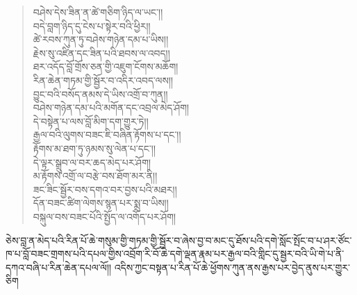 \documentclass{article}
\begin{document}
\begin{verse}
    བཤེས་དེས་ཟིན་ན་ཚེ་གཅིག་ཉིད་ལ་ཡང༌།། \\
    བདེ་བླག་ཉིད་དུ་ངེས་པ་སྟེར་བའི་ཕྱིར།། \\
    ཚེ་རབས་ཀུན་ཏུ་བཤེས་གཉེན་དམ་པ་ཡིས།། \\
    རྗེས་སུ་འཛིན་དང་ཟིན་པའི་ཐབས་ལ་འབད།། \\
    ཐར་འདོད་བློ་གྲོས་ཅན་གྱི་འཇུག་ངོགས་མཆོག། \\
    རིན་ཆེན་གཏམ་གྱི་སྦྱོར་བ་འདིར་འབད་ལས།། \\
    བྱུང་བའི་བསོད་ནམས་དེ་ཡིས་འགྲོ་བ་ཀུན།། \\
    བཤེས་གཉེན་དམ་པའི་མགོན་དང་འབྲལ་མེད་ཤོག། \\
    དེ་བསྟེན་པ་ལས་བློ་མིག་དག་གྱུར་ཏེ།། \\
    རྒྱལ་བའི་ལུགས་བཟང་ཇི་བཞིན་རྟོགས་པ་དང༌།། \\
    རྟོགས་མ་ཐག་ཏུ་ཉམས་སུ་ལེན་པ་དང༌།། \\
    དེ་ལྟར་སྒྲུབ་ལ་བར་ཆད་མེད་པར་ཤོག། \\
    མ་རྟོགས་འགྲོ་ལ་བརྩེ་བས་ཐོག་མར་ནི།། \\
    ཟང་ཟིང་སྦྱོར་བས་དགའ་བར་བྱས་པའི་མཐར།། \\
    དོན་བཟང་ཚིག་ལེགས་སྙན་པར་སྨྲ་བ་ཡིས།། \\
    བསྐུལ་བས་བཟང་པོའི་སྤྱོད་ལ་འགོད་པར་ཤོག།
\end{verse}

{\small ཅེས་བླ་ན་མེད་པའི་རིན་པོ་ཆེ་གསུམ་གྱི་གཏམ་གྱི་སྦྱོར་བ་ཞེས་བྱ་བ་མང་དུ་ཐོས་པའི་དགེ་སློང་སྤོང་བ་པ་ཤར་ཙོང་ཁ་པ་བློ་བཟང་གྲགས་པའི་དཔལ་གྱིས་འབྲོག་རི་བོ་ཆེ་དགེ་ལྡན་རྣམ་པར་རྒྱལ་བའི་གླིང་དུ་སྦྱར་བའི་ཡི་གེ་པ་ནི་དཀའ་བཞི་པ་རིན་ཆེན་དཔལ་ལོ།།
འདིས་ཀྱང་བསྟན་པ་རིན་པོ་ཆེ་ཕྱོགས་ཀུན་ནས་རྒྱས་པར་བྱེད་ནུས་པར་གྱུར་ཅིག}
\end{document}
